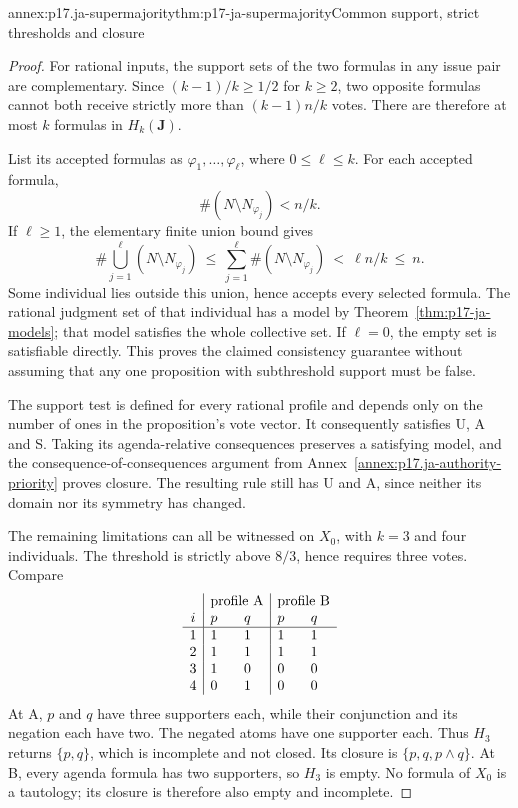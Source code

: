 \begin{annexitem}{annex:p17.ja-supermajority}{thm:p17-ja-supermajority}{Common support, strict thresholds and closure}
\begin{proof}
For rational inputs, the support sets of the two formulas in any issue pair
are complementary. Since \((k-1)/k\geq1/2\) for \(k\geq2\), two opposite
formulas cannot both receive strictly more than \((k-1)n/k\) votes. There
are therefore at most \(k\) formulas in \(H_k(\mathbf J)\).

List its accepted formulas as \(\varphi_1,\ldots,\varphi_\ell\), where
\(0\leq\ell\leq k\). For each accepted formula,
\[
 \#(N\setminus N_{\varphi_j})<n/k.
\]
If \(\ell\geq1\), the elementary finite union bound gives
\[
 \#\bigcup_{j=1}^{\ell}(N\setminus N_{\varphi_j})
 \ \leq\ \sum_{j=1}^{\ell}\#(N\setminus N_{\varphi_j})
 \ <\ \ell n/k\ \leq\ n.
\]
Some individual lies outside this union, hence accepts every selected formula.
The rational judgment set of that individual has a model by
Theorem~\ref{thm:p17-ja-models}; that model satisfies the whole collective
set. If \(\ell=0\), the empty set is satisfiable directly. This proves the
claimed consistency guarantee without assuming that any one proposition
with subthreshold support must be false.

The support test is defined for every rational profile and depends only on the
number of ones in the proposition's vote vector. It consequently satisfies U,
A and S. Taking its agenda-relative consequences preserves a satisfying model,
and the consequence-of-consequences argument from
Annex~\ref{annex:p17.ja-authority-priority} proves closure. The resulting rule
still has U and A, since neither its domain nor its symmetry has changed.

The remaining limitations can all be witnessed on \(X_0\), with \(k=3\) and
four individuals. The threshold is strictly above \(8/3\), hence requires
three votes. Compare
\[
 \begin{array}{c|cc|cc}
 &\multicolumn{2}{c|}{\text{profile A}}&\multicolumn{2}{c}{\text{profile B}}\\
 i&p&q&p&q\\ \hline
 1&1&1&1&1\\
 2&1&1&1&1\\
 3&1&0&0&0\\
 4&0&1&0&0
 \end{array}
\]
At A, \(p\) and \(q\) have three supporters each, while their conjunction
and its negation each have two. The negated atoms have one supporter each.
Thus \(H_3\) returns \(\{p,q\}\), which is incomplete and not closed.
Its closure is \(\{p,q,p\land q\}\). At B, every agenda formula has two
supporters, so \(H_3\) is empty. No formula of \(X_0\) is a tautology;
its closure is therefore also empty and incomplete.


\end{proof}
\end{annexitem}
